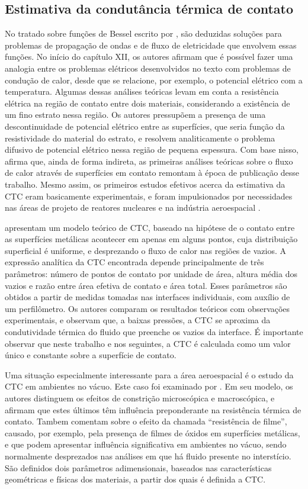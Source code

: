 \subsection{Estimativa da condutância térmica de contato}

No tratado sobre funções de Bessel escrito por \cite{livro_bessel}, são deduzidas soluções para problemas de propagação de ondas e de fluxo de
eletricidade que envolvem essas funções. No início do capítulo XII, os autores afirmam que é possível fazer uma analogia entre os problemas
elétricos desenvolvidos no texto com problemas de condução de calor, desde que se relacione, por exemplo, o potencial elétrico com a temperatura. Algumas
dessas análises teóricas levam em conta a resistência elétrica na região de contato entre dois materiais, considerando a existência de um fino
estrato nessa região. Os autores pressupõem a presença de uma descontinuidade de potencial elétrico entre as superfícies,
que seria função da resistividade do material do estrato, e resolvem analiticamente o problema difusivo de potencial elétrico nessa região de pequena espessura. 
Com base nisso, \cite{tese_mikic} afirma que, ainda de forma indireta, as primeiras análises teóricas sobre o fluxo de calor através de superfícies
em contato remontam à época de publicação desse trabalho. Mesmo assim, os primeiros estudos efetivos acerca da estimativa da CTC eram basicamente experimentais,
e foram impulsionados por necessidades nas áreas de projeto de reatores nucleares e na indústria aeroespacial \citep{tese_mikic}.

\cite{artigo_fenech} apresentam um modelo
teórico de CTC, baseado na hipótese de o contato entre as superfícies metálicas acontecer em apenas em alguns pontos, cuja distribuição superficial
é uniforme, e desprezando o fluxo de calor
nas regiões de vazios. A expressão analítica da CTC encontrada depende principalmente de três parâmetros: número de pontos de contato por unidade
de área, altura média dos vazios e razão entre área efetiva de contato e área total. Esses parâmetros são obtidos a partir de medidas tomadas nas
interfaces individuais, com auxílio de um perfilômetro. Os autores comparam os resultados teóricos com observações experimentais, e observam que,
a baixas pressões, a CTC se aproxima da condutividade térmica do fluido que preenche os vazios da interface. É importante observar que neste trabalho
e nos seguintes, a CTC é calculada como um valor único e constante sobre a superfície de contato.

Uma situação especialmente interessante para a área aeroespacial é o estudo da CTC em ambientes no vácuo. Este caso foi examinado por \cite{artigo_clausing}.
Em seu modelo, os autores distinguem os efeitos de constrição microscópica e macroscópica, e afirmam que estes últimos têm influência preponderante
na resistência térmica de contato. Tambem comentam sobre o efeito da chamada ``resistência de filme'', causado, por exemplo, pela presença de
filmes de óxidos em superfícies metálicas, e que podem apresentar influência significativa em ambientes no vácuo, sendo normalmente desprezados
nas análises em que há fluido presente no interstício. São definidos dois parâmetros adimensionais, baseados nas características geométricas e
físicas dos materiais, a partir dos quais é definida a CTC. 

